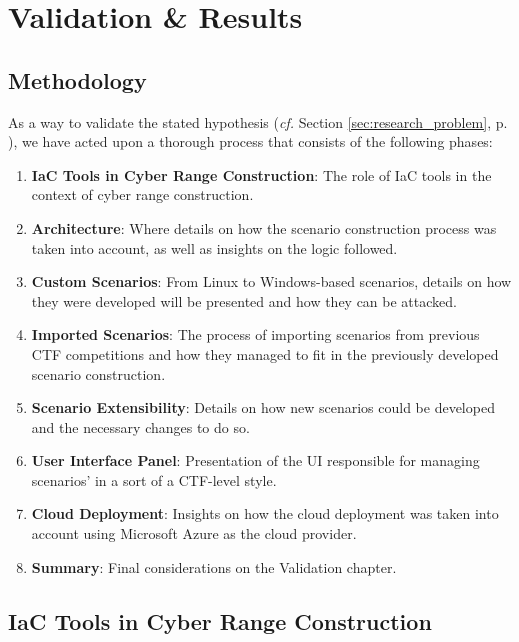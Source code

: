 \chapter{Validation \& Results}\label{chap:validation}

\minitoc

\section{Methodology} \label{sec:validation_methodology}

As a way to validate the stated hypothesis (\textit{cf.} Section \ref{sec:research_problem}, p. \pageref{sec:research_problem}), we have acted upon a thorough process that consists of the following phases:

\begin{enumerate}
    \item \textbf{IaC Tools in Cyber Range Construction}: The role of IaC tools in the context of cyber range construction. %
    \item \textbf{Architecture}: Where details on how the scenario construction process was taken into account, as well as insights on the logic followed.%
    \item \textbf{Custom Scenarios}: From Linux to Windows-based scenarios, details on how they were developed will be presented and how they can be attacked.
    \item \textbf{Imported Scenarios}: The process of importing scenarios from previous CTF competitions and how they managed to fit in the previously developed scenario construction.
    \item \textbf{Scenario Extensibility}: Details on how new scenarios could be developed and the necessary changes to do so.
    \item \textbf{User Interface Panel}: Presentation of the UI responsible for managing scenarios' in a sort of a CTF-level style.
    \item \textbf{Cloud Deployment}: Insights on how the cloud deployment was taken into account using Microsoft Azure as the cloud provider.
    \item \textbf{Summary}: Final considerations on the Validation chapter.
\end{enumerate}


\section{IaC Tools in Cyber Range Construction} \label{sec:validation_iac_tools_in_cr_construction}

